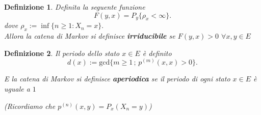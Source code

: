 \documentclass{article}
\newtheorem{definition}{Definizione}[section]
\begin{document}


\begin{definition}
\label{def:irriducibile}
Definita la seguente funzione 
$$F(y, x) = P_y\{\rho_x < \infty\}.$$
dove $\rho_x := \inf\{n \geq 1 : X_n = x\}.$ \\
 Allora la catena di Markov si definisce \textbf{irriducibile} se $F(y,x) > 0$ $\forall x, y \in E$ 
\end{definition} 

\begin{definition}
\label{def:aperiodica}
Il \textit{periodo} dello stato $x \in E$ è definito 
$$d(x) := \mathrm{gcd} \{m \geq 1 \,;\, p^{(m)}(x, x) > 0\}.$$

E la catena di Markov si definisce \textbf{aperiodica} se il periodo di ogni stato $x \in E$ è uguale a $1$

(Ricordiamo che $p^{(n)}(x, y) = P_x(X_n = y)$)
\end{definition}
\end{document}
